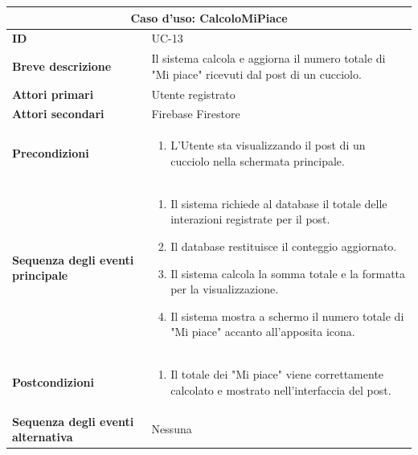 \documentclass[a4paper]{report}
\begin{document}
\begin{table}[H]
\vspace*{-0cm}
\renewcommand{\arraystretch}{1.9}
\begin{tabular}{|p{3.9cm}|p{9.9cm}|}
\hline
\multicolumn{2}{|c|}{\textbf{Caso d’uso: CalcoloMiPiace}} \\ \hline
\textbf{ID} & UC-13 \\ \hline
\textbf{Breve descrizione} & Il sistema calcola e aggiorna il numero totale di "Mi piace" ricevuti dal post di un cucciolo. \\ \hline
\textbf{Attori primari} & Utente registrato \\ \hline
\textbf{Attori secondari} & Firebase Firestore \\ \hline
\textbf{Precondizioni} & \begin{enumerate}[leftmargin=14pt,label=\arabic*.,labelsep=0.5em,topsep=0pt,partopsep=0pt,parsep=0pt,itemsep=0pt]
    \item L'Utente sta visualizzando il post di un cucciolo nella schermata principale.
\end{enumerate} \\ \hline
\textbf{Sequenza degli eventi principale} &
\begin{enumerate}[leftmargin=14pt,label=\arabic*.,labelsep=0.5em,topsep=0pt,partopsep=0pt,parsep=0pt,itemsep=0pt]
   \item Il sistema richiede al database il totale delle interazioni registrate per il post.
   \item Il database restituisce il conteggio aggiornato.
   \item Il sistema calcola la somma totale e la formatta per la visualizzazione.
   \item Il sistema mostra a schermo il numero totale di "Mi piace" accanto all'apposita icona.
\end{enumerate}\\ \hline
\textbf{Postcondizioni} &
\begin{enumerate}[leftmargin=14pt,label=\arabic*.,labelsep=0.5em,topsep=0pt,partopsep=0pt,parsep=0pt,itemsep=0pt]
\item Il totale dei "Mi piace" viene correttamente calcolato e mostrato nell'interfaccia del post.
\end{enumerate} \\ \hline
\textbf{Sequenza degli eventi alternativa} & Nessuna \\ \hline
\end{tabular}
\end{table}
\end{document}
